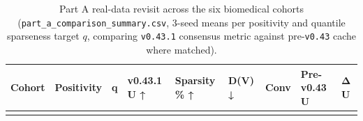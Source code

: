 \documentclass[
  10pt,
  letterpaper,
]{report}
\begin{document}
\begin{longtable}[]{@{}
  >{\raggedright\arraybackslash}p{}
  >{\raggedright\arraybackslash}p{}
  >{\raggedleft\arraybackslash}p{}
  >{\raggedleft\arraybackslash}p{}
  >{\raggedleft\arraybackslash}p{}
  >{\raggedleft\arraybackslash}p{}
  >{\raggedleft\arraybackslash}p{}
  >{\raggedleft\arraybackslash}p{}
  >{\raggedleft\arraybackslash}p{}@{}}
\caption{Part A real-data revisit across the six biomedical cohorts
(\protect\texttt{part\_a\_comparison\_summary.csv}, 3-seed means per
positivity and quantile sparseness target \(q\), comparing
\protect\texttt{v0.43.1} consensus metric against
pre-\protect\texttt{v0.43} cache where
matched).}\label{tbl-v043-part-a}\tabularnewline
\toprule\noalign{}
\begin{minipage}[b]{\linewidth}\raggedright
Cohort
\end{minipage} & \begin{minipage}[b]{\linewidth}\raggedright
Positivity
\end{minipage} & \begin{minipage}[b]{\linewidth}\raggedleft
q
\end{minipage} & \begin{minipage}[b]{\linewidth}\raggedleft
v0.43.1 U ↑
\end{minipage} & \begin{minipage}[b]{\linewidth}\raggedleft
Sparsity \% ↑
\end{minipage} & \begin{minipage}[b]{\linewidth}\raggedleft
D(V) ↓
\end{minipage} & \begin{minipage}[b]{\linewidth}\raggedleft
Conv
\end{minipage} & \begin{minipage}[b]{\linewidth}\raggedleft
Pre-v0.43 U
\end{minipage} & \begin{minipage}[b]{\linewidth}\raggedleft
Δ U
\end{minipage} \\
\midrule\noalign{}
\endfirsthead
\toprule\noalign{}
\begin{minipage}[b]{\linewidth}\raggedright

\end{minipage}
\end{longtable}
\end{document}
